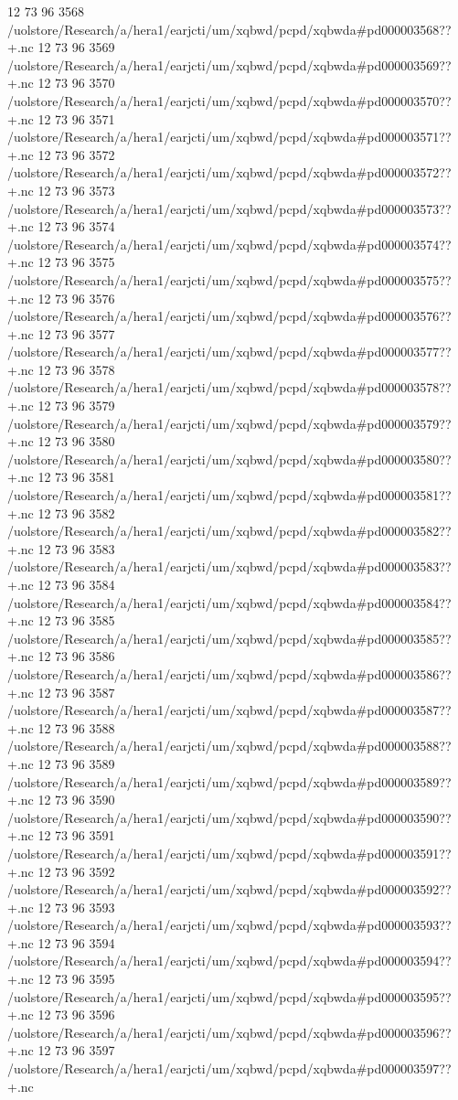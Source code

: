 12 73 96
3568
/uolstore/Research/a/hera1/earjcti/um/xqbwd/pcpd/xqbwda#pd000003568??+.nc
12 73 96
3569
/uolstore/Research/a/hera1/earjcti/um/xqbwd/pcpd/xqbwda#pd000003569??+.nc
12 73 96
3570
/uolstore/Research/a/hera1/earjcti/um/xqbwd/pcpd/xqbwda#pd000003570??+.nc
12 73 96
3571
/uolstore/Research/a/hera1/earjcti/um/xqbwd/pcpd/xqbwda#pd000003571??+.nc
12 73 96
3572
/uolstore/Research/a/hera1/earjcti/um/xqbwd/pcpd/xqbwda#pd000003572??+.nc
12 73 96
3573
/uolstore/Research/a/hera1/earjcti/um/xqbwd/pcpd/xqbwda#pd000003573??+.nc
12 73 96
3574
/uolstore/Research/a/hera1/earjcti/um/xqbwd/pcpd/xqbwda#pd000003574??+.nc
12 73 96
3575
/uolstore/Research/a/hera1/earjcti/um/xqbwd/pcpd/xqbwda#pd000003575??+.nc
12 73 96
3576
/uolstore/Research/a/hera1/earjcti/um/xqbwd/pcpd/xqbwda#pd000003576??+.nc
12 73 96
3577
/uolstore/Research/a/hera1/earjcti/um/xqbwd/pcpd/xqbwda#pd000003577??+.nc
12 73 96
3578
/uolstore/Research/a/hera1/earjcti/um/xqbwd/pcpd/xqbwda#pd000003578??+.nc
12 73 96
3579
/uolstore/Research/a/hera1/earjcti/um/xqbwd/pcpd/xqbwda#pd000003579??+.nc
12 73 96
3580
/uolstore/Research/a/hera1/earjcti/um/xqbwd/pcpd/xqbwda#pd000003580??+.nc
12 73 96
3581
/uolstore/Research/a/hera1/earjcti/um/xqbwd/pcpd/xqbwda#pd000003581??+.nc
12 73 96
3582
/uolstore/Research/a/hera1/earjcti/um/xqbwd/pcpd/xqbwda#pd000003582??+.nc
12 73 96
3583
/uolstore/Research/a/hera1/earjcti/um/xqbwd/pcpd/xqbwda#pd000003583??+.nc
12 73 96
3584
/uolstore/Research/a/hera1/earjcti/um/xqbwd/pcpd/xqbwda#pd000003584??+.nc
12 73 96
3585
/uolstore/Research/a/hera1/earjcti/um/xqbwd/pcpd/xqbwda#pd000003585??+.nc
12 73 96
3586
/uolstore/Research/a/hera1/earjcti/um/xqbwd/pcpd/xqbwda#pd000003586??+.nc
12 73 96
3587
/uolstore/Research/a/hera1/earjcti/um/xqbwd/pcpd/xqbwda#pd000003587??+.nc
12 73 96
3588
/uolstore/Research/a/hera1/earjcti/um/xqbwd/pcpd/xqbwda#pd000003588??+.nc
12 73 96
3589
/uolstore/Research/a/hera1/earjcti/um/xqbwd/pcpd/xqbwda#pd000003589??+.nc
12 73 96
3590
/uolstore/Research/a/hera1/earjcti/um/xqbwd/pcpd/xqbwda#pd000003590??+.nc
12 73 96
3591
/uolstore/Research/a/hera1/earjcti/um/xqbwd/pcpd/xqbwda#pd000003591??+.nc
12 73 96
3592
/uolstore/Research/a/hera1/earjcti/um/xqbwd/pcpd/xqbwda#pd000003592??+.nc
12 73 96
3593
/uolstore/Research/a/hera1/earjcti/um/xqbwd/pcpd/xqbwda#pd000003593??+.nc
12 73 96
3594
/uolstore/Research/a/hera1/earjcti/um/xqbwd/pcpd/xqbwda#pd000003594??+.nc
12 73 96
3595
/uolstore/Research/a/hera1/earjcti/um/xqbwd/pcpd/xqbwda#pd000003595??+.nc
12 73 96
3596
/uolstore/Research/a/hera1/earjcti/um/xqbwd/pcpd/xqbwda#pd000003596??+.nc
12 73 96
3597
/uolstore/Research/a/hera1/earjcti/um/xqbwd/pcpd/xqbwda#pd000003597??+.nc
